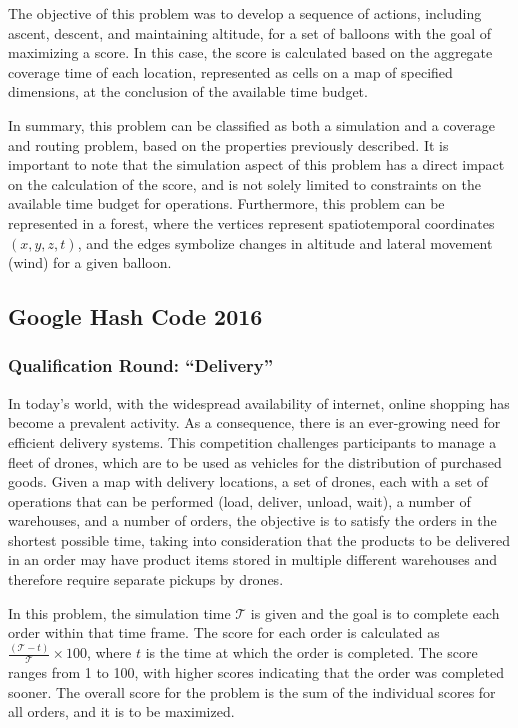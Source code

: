 The objective of this problem was to develop a sequence of actions, including
ascent, descent, and maintaining altitude, for a set of balloons with the goal
of maximizing a score. In this case, the score is calculated based on the
aggregate coverage time of each location, represented as cells on a map of
specified dimensions, at the conclusion of the available time budget.

In summary, this problem can be classified as both a simulation and a
coverage and routing problem, based on the properties previously
described. It is important to note that the simulation aspect of this problem
has a direct impact on the calculation of the score, and is not solely limited
to constraints on the available time budget for operations. Furthermore, this
problem can be represented in a forest, where the vertices represent
spatiotemporal coordinates $(x, y, z, t)$, and the edges symbolize changes in
altitude and lateral movement (wind) for a given balloon.

\subsection{Google Hash Code 2016}
\label{section:hashcode2016}

\subsubsection{Qualification Round: ``Delivery''}
\label{section:hashcode2016-qualification}

In today's world, with the widespread availability of internet, online shopping
has become a prevalent activity. As a consequence, there is an ever-growing
need for efficient delivery systems. This competition challenges participants to
manage a fleet of drones, which are to be used as vehicles for the distribution
of purchased goods. Given a map with delivery locations, a set of drones, each
with a set of operations that can be performed (load, deliver, unload, wait), a
number of warehouses, and a number of orders, the objective is to satisfy the
orders in the shortest possible time, taking into consideration that the
products to be delivered in an order may have product items stored in multiple
different warehouses and therefore require separate pickups by drones.

In this problem, the simulation time $\mathcal{T}$ is given and the goal is to
complete each order within that time frame. The score for each order is
calculated as $\frac{(\mathcal{T} - t)}{\mathcal{T}} \times 100$, where $t$ is the
time at which the order is completed. The score ranges from 1 to 100, with
higher scores indicating that the order was completed sooner. The overall score
for the problem is the sum of the individual scores for all orders, and it
is to be maximized.

